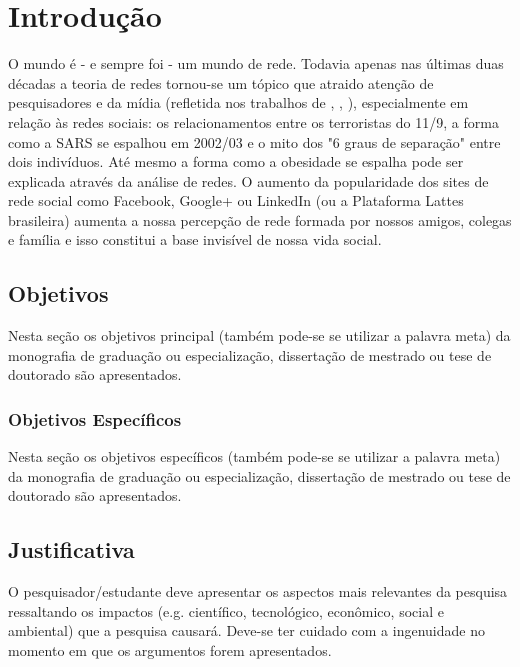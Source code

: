 \chapter{Introdução}
\label{chap:intro}

O mundo \'e - e sempre foi - um mundo de rede. Todavia apenas nas \'ultimas duas d\'ecadas a teoria de redes tornou-se um t\'opico que atraido aten\c{c}\~ao de pesquisadores e da m\'idia (refletida nos trabalhos de \cite{Barabasi2003-1}, \cite{Watts2003}, \cite{NBW2006}), especialmente em rela\c{c}\~ao \`as redes sociais: os relacionamentos entre os terroristas do 11/9, a forma como a SARS se espalhou em 2002/03 e o mito dos "6 graus de separa\c{c}\~ao" entre dois indiv\'iduos. At\'e mesmo a forma como a obesidade se espalha pode ser explicada atrav\'es da an\'alise de redes. O aumento da popularidade dos sites de rede social como Facebook, Google+ ou LinkedIn (ou a Plataforma Lattes brasileira) aumenta a nossa percep\c{c}\~ao de rede formada por nossos amigos, colegas e fam\'ilia e isso constitui a base invis\'ivel de nossa vida social.

\section{Objetivos}
\label{sec:obj}

Nesta se\c{c}\~ao os objetivos principal (tamb\'em
pode-se se utilizar a palavra meta) da monografia de
gradua\c{c}\~ao ou especializa\c{c}\~ao, disserta\c{c}\~ao de
mestrado ou tese de doutorado s\~ao apresentados.


\subsection{Objetivos Específicos}
\label{ssec:objesp}

Nesta se\c{c}\~ao os objetivos espec\'ificos (tamb\'em
pode-se se utilizar a palavra meta) da monografia de
gradua\c{c}\~ao ou especializa\c{c}\~ao, disserta\c{c}\~ao de
mestrado ou tese de doutorado s\~ao apresentados.

\section{Justificativa}
\label{sec:justi}

O pesquisador/estudante deve apresentar os aspectos mais
relevantes da pesquisa ressaltando os impactos (e.g. cient\'ifico,
tecnol\'ogico, econ\^omico, social e ambiental) que a pesquisa
causar\'a. Deve-se ter cuidado com a ingenuidade no momento em que
os argumentos forem apresentados.


